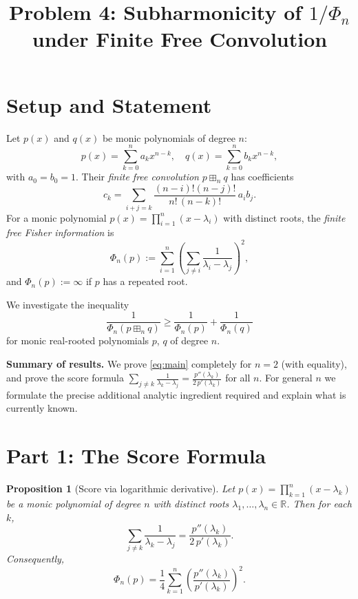 \documentclass[12pt]{article}
\title{Problem 4: Subharmonicity of $1/\Phi_n$ under Finite Free Convolution}
\author{}
\date{}
\newtheorem{proposition}[theorem]{Proposition}
\theoremstyle{definition}
\begin{document}
\maketitle

\section*{Setup and Statement}

Let $p(x)$ and $q(x)$ be monic polynomials of degree $n$:
\[
p(x) = \sum_{k=0}^n a_k x^{n-k}, \quad q(x) = \sum_{k=0}^n b_k x^{n-k},
\]
with $a_0 = b_0 = 1$. Their \emph{finite free convolution} $p \boxplus_n q$ has coefficients
\[
c_k = \sum_{i+j=k} \frac{(n-i)!(n-j)!}{n!\,(n-k)!}\,a_i b_j.
\]
For a monic polynomial $p(x) = \prod_{i=1}^n (x - \lambda_i)$ with distinct roots, the \emph{finite free Fisher information} is
\[
\Phi_n(p) := \sum_{i=1}^n \left(\sum_{j \neq i} \frac{1}{\lambda_i - \lambda_j}\right)^2,
\]
and $\Phi_n(p) := \infty$ if $p$ has a repeated root.

We investigate the inequality
\begin{equation}\label{eq:main}
\frac{1}{\Phi_n(p \boxplus_n q)} \geq \frac{1}{\Phi_n(p)} + \frac{1}{\Phi_n(q)}
\end{equation}
for monic real-rooted polynomials $p$, $q$ of degree $n$.

\textbf{Summary of results.} We prove \eqref{eq:main} completely for $n = 2$ (with equality), and prove the score formula $\sum_{j \neq k} \frac{1}{\lambda_k - \lambda_j} = \frac{p''(\lambda_k)}{2\,p'(\lambda_k)}$ for all $n$. For general $n$ we formulate the precise additional analytic ingredient required and explain what is currently known.

\section{Part 1: The Score Formula}

\begin{proposition}[Score via logarithmic derivative]\label{prop:score}
Let $p(x) = \prod_{k=1}^n (x - \lambda_k)$ be a monic polynomial of degree $n$ with distinct roots $\lambda_1, \dots, \lambda_n \in \mathbb{R}$. Then for each $k$,
\[
\sum_{j \neq k} \frac{1}{\lambda_k - \lambda_j} = \frac{p''(\lambda_k)}{2\,p'(\lambda_k)}.
\]
Consequently,
\[
\Phi_n(p) = \frac{1}{4} \sum_{k=1}^n \left(\frac{p''(\lambda_k)}{p'(\lambda_k)}\right)^2.
\]
\end{proposition}
\end{document}
